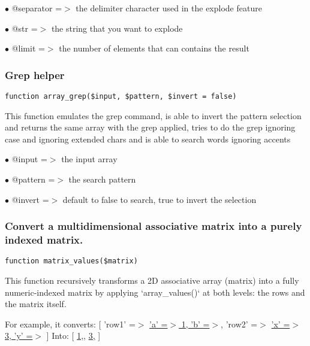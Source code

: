 \documentclass[a4paper]{article}
\def\htmladdnormallink#1#2{\href{#2}{#1}}
\begin{document}
\begin{compactitem}
\item[\color{myblue}$\bullet$] @separator =$>$ the delimiter character used in the explode feature
\item[\color{myblue}$\bullet$] @str       =$>$ the string that you want to explode
\item[\color{myblue}$\bullet$] @limit     =$>$ the number of elements that can contains the result
\end{compactitem}

\hypertarget{toc72}{}
\subsubsection{Grep helper}

\begin{lstlisting}
function array_grep($input, $pattern, $invert = false)
\end{lstlisting}

This function emulates the grep command, is able to invert the pattern
selection and returns the same array with the grep applied, tries to do
the grep ignoring case and ignoring extended chars and is able to search
words ignoring accents

\begin{compactitem}
\item[\color{myblue}$\bullet$] @input   =$>$ the input array
\item[\color{myblue}$\bullet$] @pattern =$>$ the search pattern
\item[\color{myblue}$\bullet$] @invert  =$>$ default to false to search, true to invert the selection
\end{compactitem}

\hypertarget{toc73}{}
\subsubsection{Convert a multidimensional associative matrix into a purely indexed matrix.}

\begin{lstlisting}
function matrix_values($matrix)
\end{lstlisting}

This function recursively transforms a 2D associative array (matrix)
into a fully numeric-indexed matrix by applying `array\_values()` at both
levels: the rows and the matrix itself.

For example, it converts:
    [
        'row1' =$>$ \htmladdnormallink{'a' =$>$ 1, 'b' =$>$}{2},
        'row2' =$>$ \htmladdnormallink{'x' =$>$ 3, 'y' =$>$}{4}
    ]
Into:
    [
        \htmladdnormallink{1,}{2},
        \htmladdnormallink{3,}{4}
    ]
\end{document}
